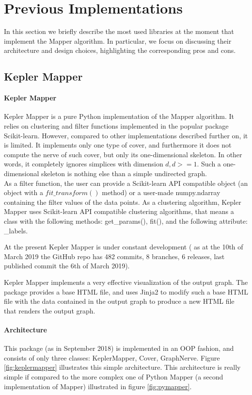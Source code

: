 \section{Previous Implementations}
In this section we briefly describe the most used libraries at the moment that implement the Mapper algorithm. In particular, we focus on discussing their architecture and design choices, highlighting the corresponding pros and cons.

\subsection{Kepler Mapper}
\paragraph{Kepler Mapper}
Kepler Mapper is a pure Python implementation of the Mapper algorithm. It relies on clustering and filter functions implemented in the popular package Scikit-learn. However, compared to other implementations described further on, it is limited. It implements only one type of cover, and furthermore it does not compute the nerve of such cover, but only its one-dimensional skeleton. In other words, it completely ignores simplices with dimension $d, d>=1$. Such a one-dimensional skeleton is nothing else than a simple undirected graph.\\
As a filter function, the user can provide a Scikit-learn API compatible object (an object with a $fit\_transform()$ method) or a user-made numpy.ndarray containing the filter values of the data points. As a clustering algorithm, Kepler Mapper uses Scikit-learn API compatible clustering algorithms, that means a class with the following methods: get\_params(), fit(), and the following attribute: \_labels.

At the present Kepler Mapper is under constant development ( as at the 10th of March 2019 the GitHub repo has 482 commits, 8 branches, 6 releases, last published commit the 6th of March 2019).

Kepler Mapper implements a very effective visualization of the output graph. The package provides a base HTML file, and uses Jinja2 to modify such a base HTML file with the data contained in the output graph to produce a new HTML file that renders the output graph.
\paragraph{Architecture}
This package (as in September 2018) is implemented in an OOP fashion, and consists of only three classes: KeplerMapper, Cover, GraphNerve. Figure \ref{fig:keplermapper} illustrates this simple architecture. This architecture is really simple if compared to the more complex one of Python Mapper (a second implementation of Mapper) illustrated in figure \ref{fig:pymapper}.
